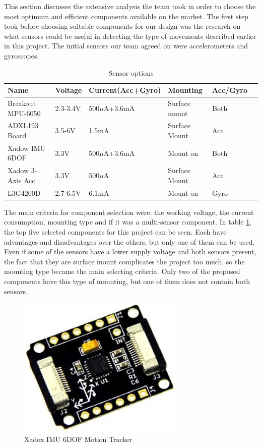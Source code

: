 This section discusses the extensive analysis the team took in order to choose the most optimum and efficient components available on the market. The first step took before choosing suitable components for our design was the research on what sensors could be useful in detecting the type of movements described earlier in this project. The initial sensors our team agreed on were accelerometers and gyroscopes.
\begin{table}[h]
	\centering
	\begin{tabular}{|l|l|l|l|l|l|}
		\hline
		Name & Voltage & Current(Acc+Gyro) & Mounting & Acc/Gyro \\
		\hline
		Breakout MPU-6050 & 2.3-3.4V & 500$\mu$A+3.6mA & Surface mount & Both\\
		ADXL193 Board & 3.5-6V & 1.5mA & Surface Mount & Acc \\
		Xadow IMU 6DOF  & 3.3V &  500$\mu$A+3.6mA & Mount on & Both \\
		Xadow 3-Axis Acc &  3.3V & 500$\mu$A & Surface Mount & Acc \\
		L3G4200D &  2.7-6.5V & 6.1mA & Mount on  & Gyro \\
		\hline
	\end{tabular}
	\caption{Sensor options}
	\label{table: componentsx}
\end{table}

The main criteria for component selection were: the working voltage, the current consumption, mounting type and if it was a multi-sensor component. In table \ref{table: componentsx}, the top five selected components for this project can be seen. Each have advantages and disadvantages over the others, but only one of them can be used. Even if some of the sensors have a lower supply voltage and both sensors present, the fact that they are surface mount complicates the project too much, so the mounting type became the main selecting criteria. Only two of the proposed components have this type of mounting, but one of them does not contain both sensors.

\begin{figure}
\centering
\includegraphics[scale=0.4]{figures/Xadow_IMU_6DOF.PNG}
\caption{Xadox IMU 6DOF Motion Tracker \label{fig:xadox}}
\end{figure}


